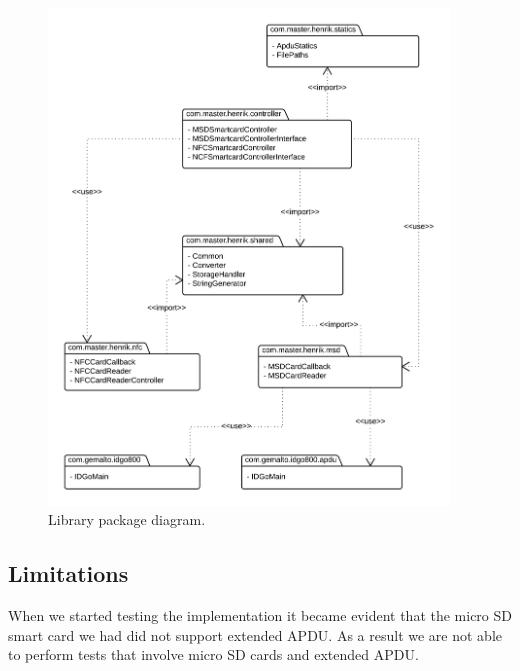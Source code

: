 \begin{figure}[h!]
  \caption{Library package diagram.}
  \label{fig:package}
  \centering
    \includegraphics[width=0.95\textwidth]{images/package2.png}
\end{figure}

\subsection{Limitations}
\label{sec:limitationsMSD}
When we started testing the implementation it became evident that the micro SD smart card we had did not support extended APDU. As a result we are not able to perform tests that involve micro SD cards and extended APDU.
